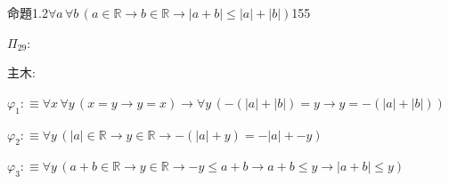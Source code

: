 \begin{fullproof}{命題1.2}{$\forall a\,\forall b\,(a \in \mathbb{R} \to b \in \mathbb{R} \to \lvert a + b \rvert \leq \lvert a \rvert + \lvert b \rvert)$}{155}
\begin{ptree}
\noLine
{}
\end{ptree}
\noindent$\Pi_{29}$:
\begin{ptree}
\noLine
{}
\noLine
{}
\noLine
{}
\noLine
{}
\end{ptree}
\noindent 主木:
\begin{ptree}
\noLine
{}
\noLine
{}
\noLine
{}
\end{ptree}
\begin{abbrevlist}
\item $\varphi_{1} :\equiv \forall x\,\forall y\,(x = y \to y = x) \to \forall y\,(-(\lvert a \rvert + \lvert b \rvert) = y \to y = -(\lvert a \rvert + \lvert b \rvert))$
\item $\varphi_{2} :\equiv \forall y\,(\lvert a \rvert \in \mathbb{R} \to y \in \mathbb{R} \to -(\lvert a \rvert + y) = -\lvert a \rvert + -y)$
\item $\varphi_{3} :\equiv \forall y\,(a + b \in \mathbb{R} \to y \in \mathbb{R} \to -y \leq a + b \to a + b \leq y \to \lvert a + b \rvert \leq y)$

\end{abbrevlist}
\end{fullproof}
